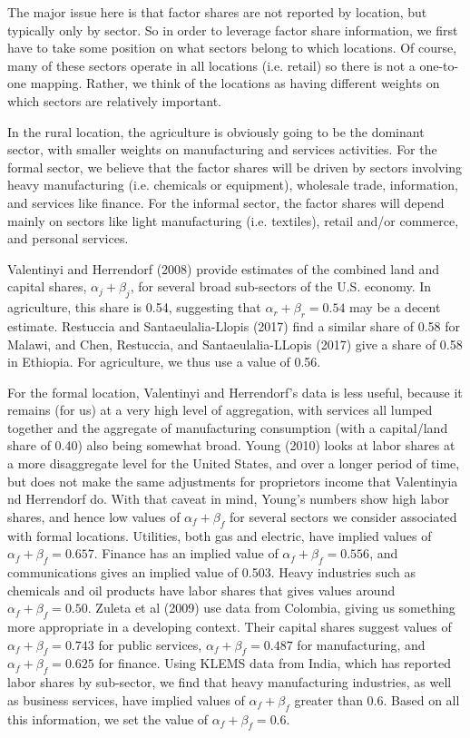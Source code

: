 \documentclass[10pt]{article}
\begin{document}
The major issue here is that factor shares are not reported by location, but typically only by sector. So in order to leverage factor share information, we first have to take some position on what sectors belong to which locations. Of course, many of these sectors operate in all locations (i.e. retail) so there is not a one-to-one mapping. Rather, we think of the locations as having different weights on which sectors are relatively important. 

In the rural location, the agriculture is obviously going to be the dominant sector, with smaller weights on manufacturing and services activities. For the formal sector, we believe that the factor shares will be driven by sectors involving heavy manufacturing (i.e. chemicals or equipment), wholesale trade, information, and services like finance. For the informal sector, the factor shares will depend mainly on sectors like light manufacturing (i.e. textiles), retail and/or commerce, and personal services. 

Valentinyi and Herrendorf (2008) provide estimates of the combined land and capital shares, $\alpha_j + \beta_j$, for several broad sub-sectors of the U.S. economy. In agriculture, this share is 0.54, suggesting that $\alpha_r + \beta_r = 0.54$ may be a decent estimate. Restuccia and Santaeulalia-Llopis (2017) find a similar share of 0.58 for Malawi, and Chen, Restuccia, and Santaeulalia-LLopis (2017) give a share of 0.58 in Ethiopia. For agriculture, we thus use a value of 0.56. 

For the formal location, Valentinyi and Herrendorf's data is less useful, because it remains (for us) at a very high level of aggregation, with services all lumped together and the aggregate of manufacturing consumption (with a capital/land share of 0.40) also being somewhat broad. Young (2010) looks at labor shares at a more disaggregate level for the United States, and over a longer period of time, but does not make the same adjustments for proprietors income that Valentinyia nd Herrendorf do. With that caveat in mind, Young's numbers show high labor shares, and hence low values of $\alpha_f + \beta_f$ for several sectors we consider associated with formal locations. Utilities, both gas and electric, have implied values of $\alpha_f + \beta_f = 0.657$. Finance has an implied value of $\alpha_f + \beta_f = 0.556$, and communications gives an implied value of 0.503. Heavy industries such as chemicals and oil products have labor shares that gives values around $\alpha_f + \beta_f = 0.50$. Zuleta et al (2009) use data from Colombia, giving us something more appropriate in a developing context. Their capital shares suggest values of $\alpha_f + \beta_f = 0.743$ for public services, $\alpha_f + \beta_f = 0.487$ for manufacturing, and $\alpha_f + \beta_f = 0.625$ for finance. Using KLEMS data from India, which has reported labor shares by sub-sector, we find that heavy manufacturing industries, as well as business services, have implied values of $\alpha_f + \beta_f$ greater than 0.6. Based on all this information, we set the value of $\alpha_f + \beta_f = 0.6$.
\end{document}
